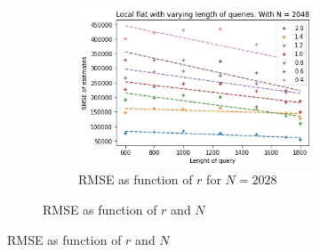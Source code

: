 \documentclass[11pt]{article}
\theoremstyle{definition}
\begin{document}
\begin{figure}[H]
\begin{subfigure}{.4\textwidth}
\begin{subfigure}{\textwidth}
  \includegraphics[width=\linewidth]{figures/local_flat/varying_r/loc_flat_varying_length_N_linear_=2048.png}
  \caption{RMSE as function of $r$ for $N=2028$}
  \label{fig:26}
\end{subfigure}
\caption{RMSE as function of $r$ and $N$}
\label{fig:27}
\end{subfigure}
\caption{RMSE as function of $r$ and $N$}
\label{fig:28}
\end{figure}
\end{document}
